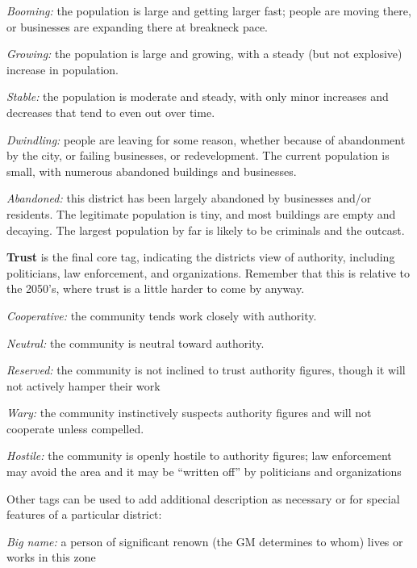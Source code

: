 \documentclass[oneside,10pt]{article}
\begin{document}
\begin{multicols}{2}
\begin{adjustwidth*}{.5cm}{.5cm}
\textit{Booming:} the population is large and getting larger fast;
people are moving there, or businesses are expanding
there at breakneck pace.

\textit{Growing:} the population is large and growing, with a
steady (but not explosive) increase in population.

\textit{Stable:} the population is moderate and steady, with only
minor increases and decreases that tend to even out over
time.

\textit{Dwindling:} people are leaving for some reason, whether
because of abandonment by the city, or failing businesses,
or redevelopment. The current population is small, with
numerous abandoned buildings and businesses.

\textit{Abandoned:} this district has been largely abandoned by
businesses and/or residents. The legitimate population
is tiny, and most buildings are empty and decaying. The
largest population by far is likely to be criminals and the
outcast.
\end{adjustwidth*}

\textbf{Trust} is the final core tag, indicating the districts view of authority, including politicians, law enforcement, and organizations. Remember that this is relative to the 2050’s, where
trust is a little harder to come by anyway.
\begin{adjustwidth*}{.5cm}{.5cm}

\textit{Cooperative:} the community tends work closely with authority.

\textit{Neutral:} the community is neutral toward authority.

\textit{Reserved:} the community is not inclined to trust authority
figures, though it will not actively hamper their work

\textit{Wary:} the community instinctively suspects authority figures and will not cooperate unless compelled.

\textit{Hostile:} the community is openly hostile to authority figures; law enforcement may avoid the area and it may be
“written off” by politicians and organizations
\end{adjustwidth*}

Other tags can be used to add additional description as necessary or for special features of a particular district:
\begin{adjustwidth*}{.5cm}{.5cm}

\textit{Big name:} a person of significant renown (the GM determines to whom) lives or works in this zone


\end{adjustwidth*}
\end{multicols}
\end{document}
